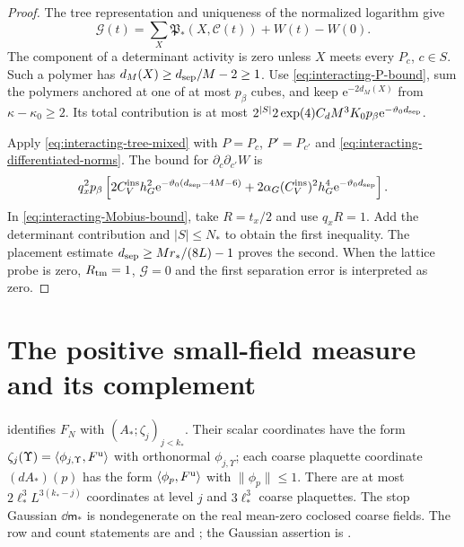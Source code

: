 \begin{proof}
The tree representation and uniqueness of the
normalized logarithm give
\[
 \mathcal G(t)=\sum_X\mathfrak P_*(X,\mathscr C(t))+W(t)-W(0).
\]
The component of a determinant activity is zero
unless $X$ meets every $P_c$, $c\in S$.
Such a polymer has
$d_M(X)\ge d_{\rm sep}/M-2\ge1$.
Use \eqref{eq:interacting-P-bound}, sum the
polymers anchored at one of at most $p_\beta$
cubes, and keep $\mathrm e^{-2d_M(X)}$ from
$\kappa-\kappa_0\ge2$.
Its total contribution is at most
$2^{|S|}2\exp(4)C_dM^3K_0p_\beta
\mathrm e^{-\vartheta_0d_{\rm sep}}$.

Apply \eqref{eq:interacting-tree-mixed}
with $P=P_c$, $P'=P_{c'}$ and
\eqref{eq:interacting-differentiated-norms}.
The bound for $\partial_c\partial_{c'}W$ is
\[
 q_x^2p_\beta\left[
       2C_V^{\mathrm{ins}}h_G^2\mathrm e^{-\vartheta_0(d_{\rm sep}-4M-6)}
           +2\alpha_G(C_V^{\mathrm{ins}})^2h_G^4\mathrm e^{-\vartheta_0d_{\rm sep}}\right].
\]
In \eqref{eq:interacting-Mobius-bound}, take
$R=t_x/2$ and use $q_xR=1$.
Add the determinant contribution and
$|S|\le N_*$ to obtain the first inequality.
The placement estimate
$d_{\rm sep}\ge Mr_*/(8L)-1$
proves the second.
When the lattice probe is zero,
$R_{\rm tm}=1$, $\mathcal G=0$ and the
first separation error is interpreted as zero.
\end{proof}

\section{The positive small-field measure and its complement}
\label{subsec:interacting-complement}

\cite[Proposition~3.1]{TerminalPressure} identifies $F_N$
with $(A_*;\zeta_j)_{j<k_*}$. Their scalar
coordinates have the form
$\zeta_j(\Upsilon)=\langle\phi_{j,\Upsilon},F^{\rm u}\rangle$
with orthonormal $\phi_{j,\Upsilon}$; each
coarse plaquette coordinate $(dA_*)(p)$ has
the form $\langle\phi_p,F^{\rm u}\rangle$ with
$\|\phi_p\|\le1$.
There are at most $2\ell_*^3L^{3(k_*-j)}$
coordinates at level $j$ and $3\ell_*^3$
coarse plaquettes. The stop Gaussian
$\dd\mathsf m_*$ is nondegenerate on the
real mean-zero coclosed coarse fields.
The row and count statements are
\cite[(13)]{TerminalPressure} and
\cite[(14)]{TerminalPressure}; the
Gaussian assertion is \cite[(12)]{TerminalPressure}.

